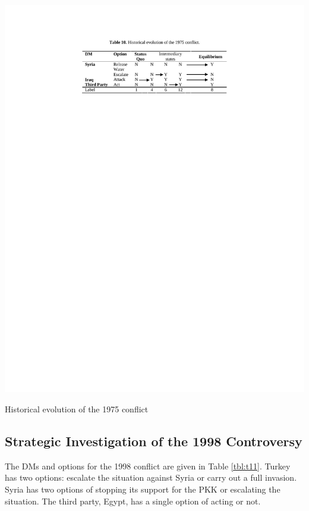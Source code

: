 \documentclass[letterpaper,12pt,titlepage,oneside,final]{book}
\begin{document}
\begin{table}[H]
\centering
\includegraphics[scale=1]{PDF-IMG/tables/10.pdf}

\caption{Historical evolution of the 1975 conflict}

\label{tbl:t10}
\end{table}

\subsection{Strategic Investigation of the 1998 Controversy}
The DMs and options for the 1998 conflict are given in Table \ref{tbl:t11}. Turkey has two options: escalate the situation against Syria or carry out a full invasion. Syria has two options of stopping its support for the PKK or escalating the situation. The third party, Egypt, has a single option of acting or not.
\end{document}
